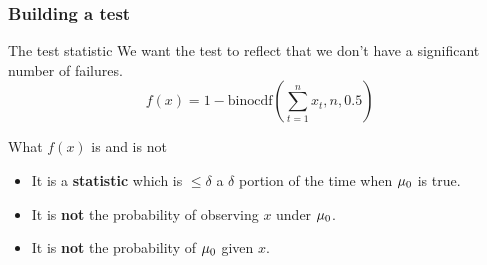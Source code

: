 \begin{frame}
  \frametitle{Building a test}
  \begin{block}{The test statistic}
    We want the test to reflect that we don't have a significant number of failures.
    \[
    f(x) = 1 - \textrm{binocdf}(\sum_{t=1}^n x_t, n, 0.5)
    \]
  \end{block}
  \begin{alertblock}{What $f(x)$ is and is not}
    \begin{itemize}
    \item It is a \textbf{statistic} which is $\leq \delta$ a $\delta$ portion of the time when $\mu_0$ is true.
    \item It is \textbf{not} the probability of observing $x$ under $\mu_0$.
    \item It is \textbf{not} the probability of $\mu_0$ given $x$.
    \end{itemize}
  \end{alertblock}
\end{frame}
